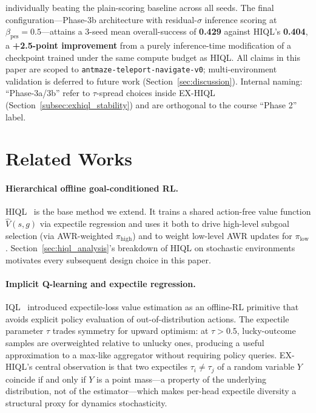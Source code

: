 \documentclass[11pt]{article}
\begin{document}
individually beating the plain-scoring baseline across all seeds.
The final configuration---Phase-3b architecture with residual-$\sigma$
inference scoring at $\beta_\text{pes} = 0.5$---attains a 3-seed mean
overall-success of \textbf{0.429} against HIQL's \textbf{0.404}, a
\textbf{+2.5-point improvement} from a purely inference-time modification
of a checkpoint trained under the same compute budget as HIQL.
All claims in this paper are scoped to
\texttt{antmaze-teleport-navigate-v0}; multi-environment validation is
deferred to future work (Section~\ref{sec:discussion}).
Internal naming: ``Phase-3a/3b'' refer to $\tau$-spread choices inside
EX-HIQL (Section~\ref{subsec:exhiql_stability}) and are orthogonal to
the course ``Phase 2'' label.

\section{Related Works}
\label{sec:related}

\paragraph{Hierarchical offline goal-conditioned RL.}
HIQL~\citep{park2023hiql} is the base method we extend.
It trains a shared action-free value function $\hat V(s,g)$ via expectile
regression and uses it both to drive high-level subgoal selection (via
AWR-weighted $\pi_\text{high}$) and to weight low-level AWR updates for
$\pi_\text{low}$.
Section~\ref{sec:hiql_analysis}'s breakdown of HIQL on stochastic
environments motivates every subsequent design choice in this paper.

\paragraph{Implicit Q-learning and expectile regression.}
IQL~\citep{kostrikov2022iql} introduced expectile-loss value estimation as
an offline-RL primitive that avoids explicit policy evaluation of
out-of-distribution actions.
The expectile parameter $\tau$ trades symmetry for upward optimism: at
$\tau > 0.5$, lucky-outcome samples are overweighted relative to unlucky
ones, producing a useful approximation to a max-like aggregator without
requiring policy queries.
EX-HIQL's central observation is that two expectiles $\tau_i \ne \tau_j$
of a random variable $Y$ coincide if and only if $Y$ is a point mass---a
property of the underlying distribution, not of the estimator---which
makes per-head expectile diversity a structural proxy for dynamics
stochasticity.
\end{document}
